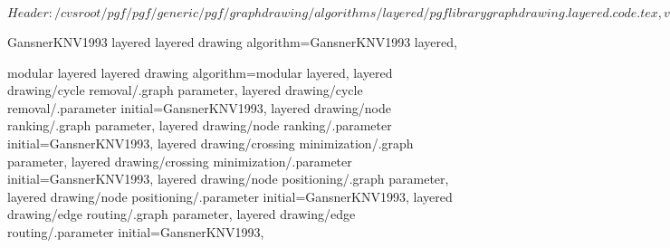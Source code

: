 %
%
%

\ProvidesFileRCS[v\pgfversion] $Header: /cvsroot/pgf/pgf/generic/pgf/graphdrawing/algorithms/layered/pgflibrarygraphdrawing.layered.code.tex,v 1.5 2011/07/26 11:29:05 jannis-pohlmann Exp $





%
% 




%
%



%
%
%
\pgfgddeclarealgorithmkey
  {GansnerKNV1993 layered}
  {layered drawing}
  {
    algorithm=GansnerKNV1993 layered,
  }


%
%
\pgfgddeclarealgorithmkey
  {modular layered}
  {layered drawing}
  {
    algorithm=modular layered,
    layered drawing/cycle removal/.graph parameter,
    layered drawing/cycle removal/.parameter initial=GansnerKNV1993,
    layered drawing/node ranking/.graph parameter,
    layered drawing/node ranking/.parameter initial=GansnerKNV1993,
    layered drawing/crossing minimization/.graph parameter,
    layered drawing/crossing minimization/.parameter initial=GansnerKNV1993,
    layered drawing/node positioning/.graph parameter,
    layered drawing/node positioning/.parameter initial=GansnerKNV1993,
    layered drawing/edge routing/.graph parameter,
    layered drawing/edge routing/.parameter initial=GansnerKNV1993,
  }

\endinput
